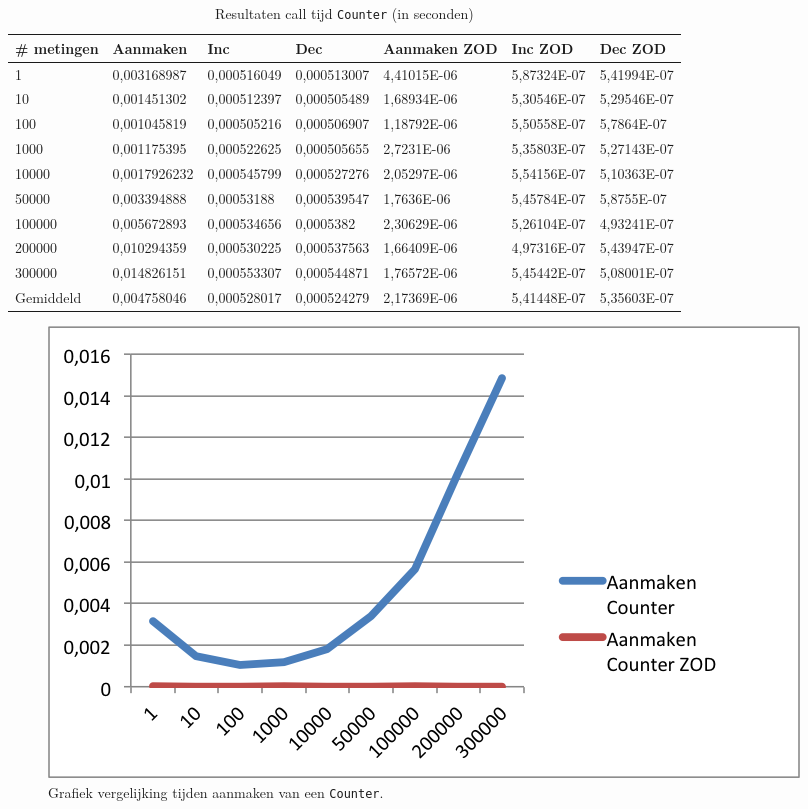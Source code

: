 \begin{table}
\centering
\begin{tabular}{|l|l|l|l|l|l|l|}
\hline
\# metingen   & Aanmaken     & Inc         & Dec         & Aanmaken ZOD & Inc ZOD     & Dec ZOD     \\ \hline
1         & 0,003168987  & 0,000516049 & 0,000513007 & 4,41015E-06  & 5,87324E-07 & 5,41994E-07 \\ \hline
10        & 0,001451302  & 0,000512397 & 0,000505489 & 1,68934E-06  & 5,30546E-07 & 5,29546E-07 \\ \hline
100       & 0,001045819  & 0,000505216 & 0,000506907 & 1,18792E-06  & 5,50558E-07 & 5,7864E-07  \\ \hline
1000      & 0,001175395  & 0,000522625 & 0,000505655 & 2,7231E-06   & 5,35803E-07 & 5,27143E-07 \\ \hline
10000     & 0,0017926232 & 0,000545799 & 0,000527276 & 2,05297E-06  & 5,54156E-07 & 5,10363E-07 \\ \hline
50000     & 0,003394888  & 0,00053188  & 0,000539547 & 1,7636E-06   & 5,45784E-07 & 5,8755E-07  \\ \hline
100000    & 0,005672893  & 0,000534656 & 0,0005382   & 2,30629E-06  & 5,26104E-07 & 4,93241E-07 \\ \hline
200000    & 0,010294359  & 0,000530225 & 0,000537563 & 1,66409E-06  & 4,97316E-07 & 5,43947E-07 \\ \hline
300000    & 0,014826151  & 0,000553307 & 0,000544871 & 1,76572E-06  & 5,45442E-07 & 5,08001E-07 \\ \hline
Gemiddeld & 0,004758046  & 0,000528017 & 0,000524279 & 2,17369E-06  & 5,41448E-07 & 5,35603E-07 \\ \hline
\end{tabular}
\caption{Resultaten call tijd \texttt{Counter} (in seconden)}
\label{Table:Counter}
\end{table}

\begin{figure}[!h]
  \centering
  \includegraphics[scale=1.0]{Afbeeldingen/Evaluatie/AanmakenCounter}
  \caption{Grafiek vergelijking tijden aanmaken van een \texttt{Counter}.}
  \label{fig:GraphCounter}
\end{figure}

